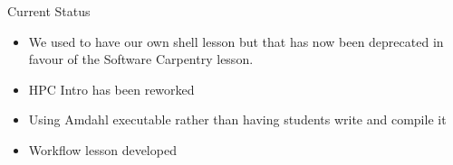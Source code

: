 \begin{frame}{Current Status}
	
	\begin{itemize}
		\item We used to have our own shell lesson but that has now been deprecated in favour of the Software Carpentry lesson.
		\item HPC Intro has been reworked
		\item Using Amdahl executable rather than having students write and compile it
		\item Workflow lesson developed
	\end{itemize}
	
	
\note{}
\end{frame}